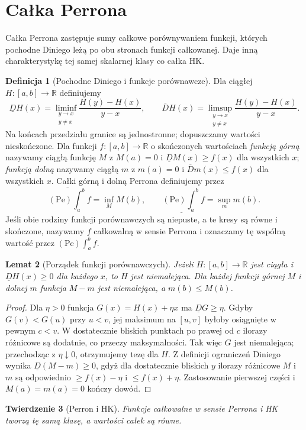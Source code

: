 \documentclass[11pt,a4paper]{article}
\numberwithin{equation}{section}
\theoremstyle{plain}
\newtheorem{twierdzenie}{Twierdzenie}[section]
\newtheorem{lemat}[twierdzenie]{Lemat}
\theoremstyle{definition}
\newtheorem{definicja}[twierdzenie]{Definicja}
\theoremstyle{remark}
\newcommand{\R}{\mathbb R}
\newcommand{\Dn}{\underline D}
\newcommand{\Du}{\overline D}
\begin{document}
\section{Całka Perrona}
Całka Perrona zastępuje sumy całkowe porównywaniem funkcji, których pochodne Diniego leżą po obu stronach funkcji całkowanej. Daje inną charakterystykę tej samej skalarnej klasy co całka HK.
\begin{definicja}[Pochodne Diniego i funkcje porównawcze]
Dla ciągłej $H:[a,b]\to\R$ definiujemy
\[
\Dn H(x)=\liminf_{\substack{y\to x\\y\ne x}}\frac{H(y)-H(x)}{y-x},\qquad
\Du H(x)=\limsup_{\substack{y\to x\\y\ne x}}\frac{H(y)-H(x)}{y-x}.
\]
Na końcach przedziału granice są jednostronne; dopuszczamy wartości nieskończone. Dla funkcji $f:[a,b]\to\R$ o skończonych wartościach \emph{funkcją górną} nazywamy ciągłą funkcję $M$ z $M(a)=0$ i $\Dn M(x)\ge f(x)$ dla wszystkich $x$; \emph{funkcją dolną} nazywamy ciągłą $m$ z $m(a)=0$ i $\Du m(x)\le f(x)$ dla wszystkich $x$. Całki górną i dolną Perrona definiujemy przez
\[
\overline{(\mathrm{Pe})\!\int_a^b}f=\inf_M M(b),\qquad
\underline{(\mathrm{Pe})\!\int_a^b}f=\sup_m m(b).
\]
Jeśli obie rodziny funkcji porównawczych są niepuste, a te kresy są równe i skończone, nazywamy $f$ całkowalną w sensie Perrona i oznaczamy tę wspólną wartość przez $(\mathrm{Pe})\int_a^b f$.
\end{definicja}
\begin{lemat}[Porządek funkcji porównawczych]
Jeżeli $H:[a,b]\to\R$ jest ciągła i $\Dn H(x)\ge0$ dla każdego $x$, to $H$ jest niemalejąca. Dla każdej funkcji górnej $M$ i dolnej $m$ funkcja $M-m$ jest niemalejąca, a $m(b)\le M(b)$.
\end{lemat}
\begin{proof}
Dla $\eta>0$ funkcja $G(x)=H(x)+\eta x$ ma $\Dn G\ge\eta$. Gdyby $G(v)<G(u)$ przy $u<v$, jej maksimum na $[u,v]$ byłoby osiągnięte w pewnym $c<v$. W dostatecznie bliskich punktach po prawej od $c$ ilorazy różnicowe są dodatnie, co przeczy maksymalności. Tak więc $G$ jest niemalejąca; przechodząc z $\eta\downarrow0$, otrzymujemy tezę dla $H$. Z definicji ograniczeń Diniego wynika $\Dn(M-m)\ge0$, gdyż dla dostatecznie bliskich $y$ ilorazy różnicowe $M$ i $m$ są odpowiednio $\ge f(x)-\eta$ i $\le f(x)+\eta$. Zastosowanie pierwszej części i $M(a)=m(a)=0$ kończy dowód.
\end{proof}
\begin{twierdzenie}[Perron i HK]
Funkcje całkowalne w sensie Perrona i HK tworzą tę samą klasę, a wartości całek są równe.
\end{twierdzenie}
\end{document}
